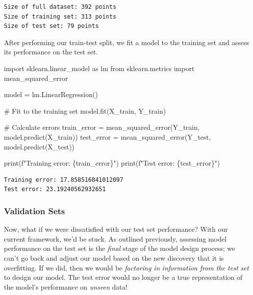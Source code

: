 \documentclass[
  letterpaper,
  DIV=11,
  numbers=noendperiod]{scrreprt}
\newenvironment{Shaded}{\begin{snugshade}}{\end{snugshade}}
\newcommand{\BuiltInTok}[1]{\textcolor[rgb]{0.00,0.23,0.31}{#1}}
\newcommand{\CommentTok}[1]{\textcolor[rgb]{0.37,0.37,0.37}{#1}}
\newcommand{\ImportTok}[1]{\textcolor[rgb]{0.00,0.46,0.62}{#1}}
\newcommand{\NormalTok}[1]{\textcolor[rgb]{0.00,0.23,0.31}{#1}}
\newcommand{\OperatorTok}[1]{\textcolor[rgb]{0.37,0.37,0.37}{#1}}
\newcommand{\SpecialCharTok}[1]{\textcolor[rgb]{0.37,0.37,0.37}{#1}}
\newcommand{\SpecialStringTok}[1]{\textcolor[rgb]{0.13,0.47,0.30}{#1}}
\begin{document}
\begin{verbatim}
Size of full dataset: 392 points
Size of training set: 313 points
Size of test set: 79 points
\end{verbatim}

After performing our train-test split, we fit a model to the training
set and assess its performance on the test set.

\begin{Shaded}
\begin{Highlighting}[]
\ImportTok{import}\NormalTok{ sklearn.linear\_model }\ImportTok{as}\NormalTok{ lm}
\ImportTok{from}\NormalTok{ sklearn.metrics }\ImportTok{import}\NormalTok{ mean\_squared\_error}

\NormalTok{model }\OperatorTok{=}\NormalTok{ lm.LinearRegression()}

\CommentTok{\# Fit to the training set}
\NormalTok{model.fit(X\_train, Y\_train)}

\CommentTok{\# Calculate errors}
\NormalTok{train\_error }\OperatorTok{=}\NormalTok{ mean\_squared\_error(Y\_train, model.predict(X\_train))}
\NormalTok{test\_error }\OperatorTok{=}\NormalTok{ mean\_squared\_error(Y\_test, model.predict(X\_test))}

\BuiltInTok{print}\NormalTok{(}\SpecialStringTok{f"Training error: }\SpecialCharTok{\{}\NormalTok{train\_error}\SpecialCharTok{\}}\SpecialStringTok{"}\NormalTok{)}
\BuiltInTok{print}\NormalTok{(}\SpecialStringTok{f"Test error: }\SpecialCharTok{\{}\NormalTok{test\_error}\SpecialCharTok{\}}\SpecialStringTok{"}\NormalTok{)}
\end{Highlighting}
\end{Shaded}

\begin{verbatim}
Training error: 17.858516841012097
Test error: 23.19240562932651
\end{verbatim}

\subsubsection{Validation Sets}\label{validation-sets}

Now, what if we were dissatisfied with our test set performance? With
our current framework, we'd be stuck. As outlined previously, assessing
model performance on the test set is the \emph{final} stage of the model
design process; we can't go back and adjust our model based on the new
discovery that it is overfitting. If we did, then we would be
\emph{factoring in information from the test set} to design our model.
The test error would no longer be a true representation of the model's
performance on \emph{unseen} data!
\end{document}
